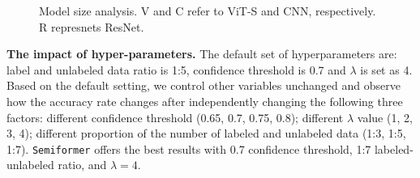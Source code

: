 \documentclass[runningheads]{llncs}
\makeatletter
\newcommand{\fakeparagraph}[1]{\textbf{#1}}
\newcommand*{\system}{\texttt{Semiformer}\@\xspace}
\newcommand\tabcaption{\def\@captype{table}\caption}
\makeatother
\begin{document}
\begin{figure}[t!]
\centering

\renewcommand\arraystretch{1.1}
\begin{minipage}[t]{.27\textwidth}
  \centering
    \setlength{\tabcolsep}{3pt}
    
    \renewcommand\arraystretch{1.0}
    \centering
\tabcaption{Results by different pseudo labels.}
    \label{table:pseudo-type}
    
    \setlength{\tabcolsep}{1.4pt}
\end{minipage}
\quad
\begin{minipage}[t]{.65\textwidth}
    \renewcommand\arraystretch{1.2}
    \centering
    \tabcaption{Model size analysis. V and C refer to ViT-S and CNN, respectively. R represnets ResNet.}
    \label{table:modelparam}
\end{minipage}

\end{figure}



\fakeparagraph{\bf The impact of hyper-parameters.}
The default  set of hyperparameters are: label and unlabeled data ratio is 1:5, confidence threshold is 0.7 and $\lambda$ is set as 4. Based on the default setting, we control other variables unchanged and observe how the accuracy rate changes after independently changing the following three factors: different confidence threshold (0.65, 0.7, 0.75, 0.8); different $\lambda$ value (1, 2, 3, 4); different proportion of the number of labeled and unlabeled data (1:3, 1:5, 1:7). \system offers the best results with 0.7 confidence threshold, 1:7 labeled-unlabeled ratio, and $\lambda=4$.
\end{document}
